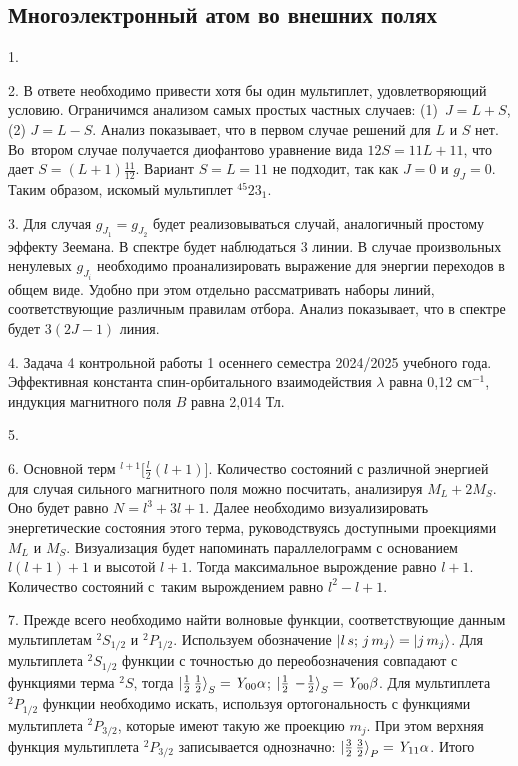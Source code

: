 \subsection{Многоэлектронный атом во внешних полях}
1. \par
2. В ответе необходимо привести хотя бы один мультиплет, удовлетворяющий условию. Ограничимся анализом самых простых частных случаев: (1)~$J=L+S$, (2) $J=L-S$. Анализ показывает, что в первом случае решений для $L$ и $S$ нет. Во~втором случае получается диофантово уравнение вида $12S=11L+11$, что дает $S=(L+1)\frac{11}{12}$. Вариант $S=L=11$ не подходит, так как $J=0$ и $g_J=0$. Таким образом, искомый мультиплет $^{45}23_{1}$.\par
3. Для случая $g_{J_1} = g_{J_2}$ будет реализовываться случай, аналогичный простому эффекту Зеемана. В спектре будет наблюдаться 3 линии. В случае произвольных ненулевых $g_{J_i}$ необходимо проанализировать выражение для энергии переходов в общем виде. Удобно при этом отдельно рассматривать наборы линий, соответствующие различным правилам отбора. Анализ показывает, что в спектре будет $3(2J-1)$ линия.\par
4. Задача 4 контрольной работы 1 осеннего семестра 2024/2025 учебного года. Эффективная константа спин-орбитального взаимодействия $\lambda$ равна 0,12 см$^{-1}$, индукция магнитного поля $B$ равна 2,014 Тл.\par
5. \par
6. Основной терм $^{l+1} \Big[ \frac l2 (l+1) \Big]$. Количество состояний с различной энергией для случая сильного магнитного поля можно посчитать, анализируя $M_L+2M_S$. Оно будет равно $N=l^3+3l+1$. Далее необходимо визуализировать энергетические состояния этого терма, руководствуясь доступными проекциями $M_L$ и $M_S$. Визуализация будет напоминать параллелограмм с основанием $l(l+1)+1$ и высотой $l+1$. Тогда максимальное вырождение равно $l+1$. Количество состояний с~таким вырождением равно $l^2-l+1$.\par
7. Прежде всего необходимо найти волновые функции, соответствующие данным мультиплетам $^2S_{1/2}$ и $^2P_{1/2}$. Используем обозначение $\ket{l\, s;\, j \, m_j} = \ket{j\,m_j}$. Для мультиплета $^2S_{1/2}$ функции с точностью до переобозначения совпадают с функциями терма $^2S$, тогда $\ket{ \frac12 \,  \frac12}_S = \textit{Y}_{00}\alpha$; $\ket{ \frac12\,-\!\frac{1}{2}}_S = \textit{Y}_{00}\beta$. Для мультиплета $^2P_{1/2}$ функции необходимо искать, используя ортогональность с функциями мультиплета $^2P_{3/2}$, которые имеют такую же проекцию $m_j$. При этом верхняя функция мультиплета $^2P_{3/2}$ записывается однозначно: $\ket{ \frac32 \,  \frac32}_P = \textit{Y}_{11}\alpha$. Итого 
